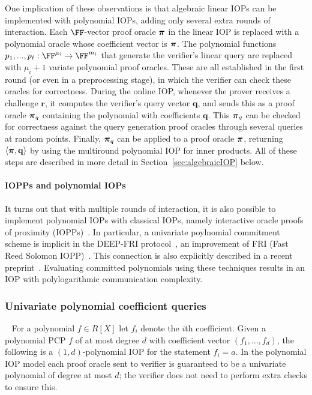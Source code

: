 One implication of these observations is that algebraic linear IOPs can be implemented with polynomial IOPs, adding only several extra rounds of interaction. Each $\FF$-vector proof oracle $\boldsymbol{\pi}$ in the linear IOP is replaced with a polynomial oracle whose coefficient vector is $\boldsymbol{\pi}$. The polynomial functions $p_1,...,p_\ell: \FF^{\mu_i} \rightarrow \FF^{m_i}$ that generate the verifier's linear query are replaced with $\mu_i+1$ variate polynomial proof oracles. These are all established in the first round (or even in a preprocessing stage), in which the verifier can check these oracles for correctness. During the online IOP, whenever the prover receives a challenge $\mathbf{r}$, it computes the verifier's query vector $\mathbf{q}$, and sends this as a proof oracle $\boldsymbol{\pi}_q$ containing the polynomial with coefficients $\mathbf{q}$. This $\boldsymbol{\pi}_q$ can be checked for correctness against the query generation proof oracles through several queries at random points. Finally, $\boldsymbol{\pi}_q$ can be applied to a proof oracle $\boldsymbol{\pi}$, returning $\langle \boldsymbol{\pi}, \mathbf{q} \rangle$ by using the multiround polynomial IOP for inner products. All of these steps are described in more detail in Section~\ref{sec:algebraicIOP} below. 

\paragraph{IOPPs and polynomial IOPs} It turns out that with multiple rounds of interaction, it is also possible to implement polynomial IOPs with classical IOPs, namely interactive oracle proofs of proximity (IOPPs)~\cite{STOC:ReiRotRot16, TCC:BenChiSpo16}. In particular, a univariate poylnomial commitment scheme is implicit in the DEEP-FRI protocol~\cite{ECCC:BGKS19}, an improvement of FRI (Fast Reed Solomon IOPP)~\cite{ICALP:BBHR18}. This connection is also explicitly described in a recent preprint~\cite{MatterLabs}. Evaluating committed polynomials using these techniques results in an IOP with polylogarithmic communication complexity.


\subsubsection{Univariate polynomial coefficient queries}~\label{sec:opencoefficient} 
For a polynomial $f \in R[X]$ let $f_i$ denote the $i$th coefficient. Given a polynomial PCP $f$ of at most degree $d$ with coefficient vector $(f_1,...,f_d)$, the following is a $(1, d)$-polynomial IOP for the statement $f_i = a$. In the polynomial IOP model each proof oracle sent to verifier is guaranteed to be a univariate polynomial of degree at most $d$; the verifier does not need to perform extra checks to ensure this.

